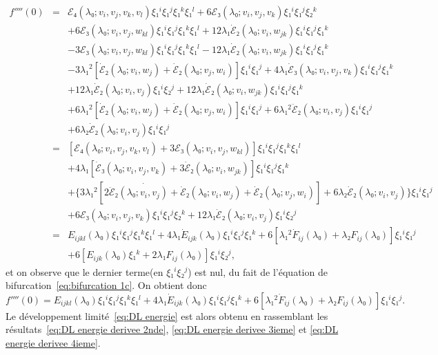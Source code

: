 \documentclass[12pt, final]{amsart}
\theoremstyle{definition}
\begin{document}
\begin{eqnarray*}
 f''''(0) & = & ℰ₄(λ₀ ; v_i, v_j, v_k {, v_l} ) ξ₁^i
 ξ₁^j ξ₁^k ξ₁^l + 6ℰ₃(λ₀ ; v_i, v_j, v_k) ξ₁^i
 ξ₁^j ξ₂^k\\
 & & + 6ℰ₃(λ₀ ; v_i, v_j, w_{k l})
 ξ₁^i ξ₁^j ξ₁^k ξ₁^l + 12 λ₁ \dot{ℰ}₂
 (λ₀ ; v_{i }, w_{j k}) ξ₁^i ξ₁^j ξ₁^k\\
 & & - 3ℰ₃(λ₀ ; v_i, v_j, w_{k l})
 ξ₁^i ξ₁^j ξ₁^k ξ₁^l - 12 λ₁ \dot{ℰ}₂
 (λ₀ ; v_i, w_{j k}) ξ₁^i ξ₁^j ξ₁^k\\
 & & - 3 λ₁^2 [\dot{ℰ}₂(λ₀ ; v_i, w_j)
 + \dot{ℰ}₂(λ₀ ; v_j, w_i)] ξ₁^i ξ₁^j + 4 λ₁
 \dot{ℰ}₃(λ₀ ; v_i, v_j, v_k) ξ₁^i ξ₁^j ξ₁^k\\
 & & + 12 λ₁ \dot{ℰ}₂(λ₀ ; v_i,
 v_j) ξ₁^i ξ₂^j + 12 λ₁ \dot{ℰ}₂(λ₀ ;
 v_i, w_{j k}) ξ₁^i ξ₁^j ξ₁^k\\
 & & + 6 λ₁^2 [\dot{ℰ}₂(λ₀ ; v_i,
 w_j) + \dot{ℰ}₂(λ₀ ; v_j, w_i)] ξ₁^i ξ₁^j + 6
 λ₁^2 \ddot{ℰ}₂(λ₀ ; v_i, v_j) ξ₁^i ξ₁^j\\
 & & + 6 λ₂ \dot{ℰ}₂(λ₀ ; v_i, v_j)
 ξ₁^i ξ₁^j\\
 & = & \left[ ℰ₄(λ₀ ; v_i, v_j, v_k {, v_l} ) +
 3ℰ₃(λ₀ ; v_i, v_j, w_{k l}) \right] ξ₁^i
 ξ₁^j ξ₁^k ξ₁^l\\
 & & + 4 λ₁ [\dot{ℰ}₃(λ₀ ; v_i, v_j,
 v_k) + 3 \dot{ℰ}₂(λ₀ ; v_i, w_{j k})] ξ₁^i
 ξ₁^j ξ₁^k\\
 & & + \{ 3 λ₁^2 [\dot{2 \ddot{ℰ}₂
 (λ₀ ; v_i, v_j) + \dot{ℰ}}₂(λ₀ ; v_i, w_j) +
 \dot{ℰ}₂(λ₀ ; v_j, w_i)] + 6 λ₂
 \dot{ℰ}₂(λ₀ ; v_i, v_j) \} ξ₁^i ξ₁^j\\
 & & + 6ℰ₃(λ₀ ; v_i, v_j, v_k) ξ₁^i ξ₁^j
 ξ₂^k + 12 λ₁ \dot{ℰ}₂(λ₀ ; v_i, v_j)
 ξ₁^i ξ₂^j\\
 & = & E_{i j k l}(λ₀) ξ₁^i ξ₁^j
 ξ₁^k ξ₁^l + 4 λ₁ \dot{E}_{i j k}
 (λ₀) ξ₁^i ξ₁^j ξ₁^k + 6 [λ₁^2 \dot{F}_{i
  j}(λ₀) + λ₂ F_{i j}(λ₀)]
 ξ₁^i ξ₁^j\\
 & & + 6 [E_{i j k}(λ₀) ξ₁^k + 2
 λ₁ F_{i j}(λ₀)] ξ₁^i ξ₂^j,
\end{eqnarray*}
et on observe que le dernier terme(en \(ξ₁^i ξ₂^j\)) est nul, du fait de l'équation de bifurcation~\eqref{eq:bifurcation 1c}. On obtient donc
\begin{equation}
 \label{eq:DL energie derivee 4ieme} f''''(0) = E_{i j k
  l}(λ₀) ξ₁^i ξ₁^j ξ₁^k ξ₁^l + 4 λ₁
 \dot{E}_{i j k}(λ₀) ξ₁^i ξ₁^j ξ₁^k + 6
 [λ₁^2 \dot{F}_{i j}(λ₀) + λ₂ F_{i
  j}(λ₀)] ξ₁^i ξ₁^j .
\end{equation}
Le développement limité~\eqref{eq:DL energie} est alors obtenu en rassemblant les résultats~\eqref{eq:DL energie derivee 2nde}, \eqref{eq:DL energie derivee 3ieme} et \eqref{eq:DL energie derivee 4ieme}.
\end{document}
